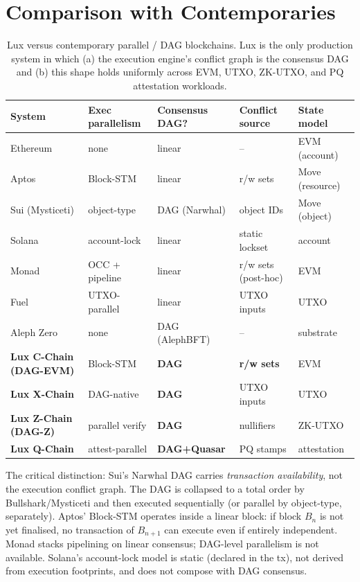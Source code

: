 \section{Comparison with Contemporaries}

\label{sec:contemporaries}

\begin{table}[h]
\centering
\small
\begin{tabular}{lllll}
\toprule
\textbf{System} & \textbf{Exec parallelism} & \textbf{Consensus DAG?} & \textbf{Conflict source} & \textbf{State model} \\
\midrule
Ethereum         & none    & linear & --                 & EVM (account) \\
Aptos            & Block-STM & linear & r/w sets          & Move (resource) \\
Sui (Mysticeti)  & object-type & DAG (Narwhal) & object IDs  & Move (object) \\
Solana           & account-lock & linear & static lockset  & account \\
Monad            & OCC + pipeline & linear & r/w sets (post-hoc) & EVM \\
Fuel             & UTXO-parallel & linear & UTXO inputs     & UTXO \\
Aleph Zero       & none    & DAG (AlephBFT) & --         & substrate \\
\midrule
\textbf{Lux C-Chain (DAG-EVM)} & Block-STM & \textbf{DAG}     & \textbf{r/w sets} & EVM \\
\textbf{Lux X-Chain}           & DAG-native & \textbf{DAG}    & UTXO inputs       & UTXO \\
\textbf{Lux Z-Chain (DAG-Z)}   & parallel verify & \textbf{DAG} & nullifiers       & ZK-UTXO \\
\textbf{Lux Q-Chain}           & attest-parallel & \textbf{DAG+Quasar} & PQ stamps & attestation \\
\bottomrule
\end{tabular}
\caption{Lux versus contemporary parallel / DAG blockchains. Lux is the
only production system in which (a) the execution engine's conflict graph
is the consensus DAG and (b) this shape holds uniformly across EVM,
UTXO, ZK-UTXO, and PQ attestation workloads.}
\label{tab:contemporaries}
\end{table}

The critical distinction: Sui's Narwhal DAG carries \emph{transaction
availability}, not the execution conflict graph. The DAG is collapsed to a
total order by Bullshark/Mysticeti and then executed sequentially (or
parallel by object-type, separately). Aptos' Block-STM operates inside a
linear block: if block $B_n$ is not yet finalised, no transaction of
$B_{n+1}$ can execute even if entirely independent. Monad stacks
pipelining on linear consensus; DAG-level parallelism is not available.
Solana's account-lock model is static (declared in the tx), not derived
from execution footprints, and does not compose with DAG consensus.

